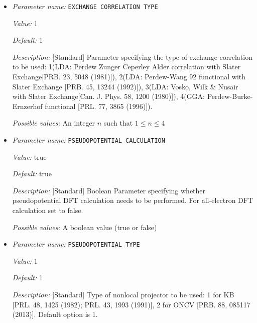 \begin{itemize}
\item {\it Parameter name:} {\tt EXCHANGE CORRELATION TYPE}
\label{parameters:DFT functional related parameters/EXCHANGE CORRELATION TYPE}
\label{parameters:DFT_20functional_20related_20parameters/EXCHANGE_20CORRELATION_20TYPE}


{\it Value:} 1


{\it Default:} 1


{\it Description:} [Standard] Parameter specifying the type of exchange-correlation to be used: 1(LDA: Perdew Zunger Ceperley Alder correlation with Slater Exchange[PRB. 23, 5048 (1981)]), 2(LDA: Perdew-Wang 92 functional with Slater Exchange [PRB. 45, 13244 (1992)]), 3(LDA: Vosko, Wilk \& Nusair with Slater Exchange[Can. J. Phys. 58, 1200 (1980)]), 4(GGA: Perdew-Burke-Ernzerhof functional [PRL. 77, 3865 (1996)]).


{\it Possible values:} An integer $n$ such that $1\leq n \leq 4$
\item {\it Parameter name:} {\tt PSEUDOPOTENTIAL CALCULATION}
\label{parameters:DFT functional related parameters/PSEUDOPOTENTIAL CALCULATION}
\label{parameters:DFT_20functional_20related_20parameters/PSEUDOPOTENTIAL_20CALCULATION}


{\it Value:} true


{\it Default:} true


{\it Description:} [Standard] Boolean Parameter specifying whether pseudopotential DFT calculation needs to be performed. For all-electron DFT calculation set to false.


{\it Possible values:} A boolean value (true or false)
\item {\it Parameter name:} {\tt PSEUDOPOTENTIAL TYPE}
\label{parameters:DFT functional related parameters/PSEUDOPOTENTIAL TYPE}
\label{parameters:DFT_20functional_20related_20parameters/PSEUDOPOTENTIAL_20TYPE}


{\it Value:} 1


{\it Default:} 1


{\it Description:} [Standard] Type of nonlocal projector to be used: 1 for KB [PRL. 48, 1425 (1982); PRL. 43, 1993 (1991)], 2 for ONCV [PRB. 88, 085117 (2013)]. Default option is 1.



\end{itemize}
